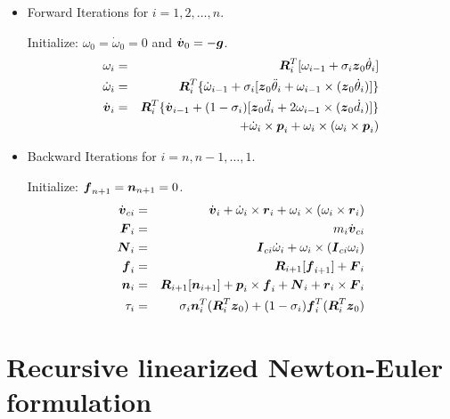 \begin{itemize}
\item Forward Iterations for $i=1, 2, \ldots, n$. 

Initialize: $\omega_0 = \dot{\omega}_0 = 0$ and $\dot{\mbox{\boldmath $ v $}}_0 = - \mbox{\boldmath $ g $}$.
\begin{eqnarray}
\omega_i & = & \mbox{\boldmath $ R $}_i^T [\omega_{i-1} + \sigma_i \mbox{\boldmath $ z $}_0 \dot{\theta}_i ] \\
\dot{\omega}_i & = & \mbox{\boldmath $ R $}_i^T  \{ \dot{\omega}_{i-1} + 
\sigma_i [\mbox{\boldmath $ z $}_0 \ddot{\theta}_i + \omega_{i-1} \times (\mbox{\boldmath $ z $}_0 \dot{\theta}_i )] \} \\
\dot{\mbox{\boldmath $ v $}}_i & = & \mbox{\boldmath $ R $}_i^T  \{ \dot{\mbox{\boldmath $ v $}}_{i-1} + 
(1 -\sigma_i) [\mbox{\boldmath $ z $}_0 \ddot{d}_i + 2 \omega_{i-1} \times (\mbox{\boldmath $ z $}_0 \dot{d}_i )] \} 
\nonumber \\ 
& & + \dot{\omega}_i \times \mbox{\boldmath $ p $}_i + \omega_i \times ( \omega_i \times \mbox{\boldmath $ p $}_i)
\end{eqnarray}

\item Backward Iterations for $i=n, n-1, \ldots, 1$. 

Initialize: $\mbox{\boldmath $ f $}_{n+1} = \mbox{\boldmath $ n $}_{n+1} = 0$.
\begin{eqnarray}
\dot{\mbox{\boldmath $ v $}}_{ci} & = & \dot{\mbox{\boldmath $ v $}}_i + \dot{\omega}_i \times \mbox{\boldmath $ r $}_i 
+ \omega_i \times (\omega_i \times \mbox{\boldmath $ r $}_i) \\
\mbox{\boldmath $ F $}_i & = & m_i \dot{\mbox{\boldmath $ v $}}_{ci} \\
\mbox{\boldmath $ N $}_i & = & \mbox{\boldmath $ I $}_{ci} \dot{\omega}_i + \omega_i \times (\mbox{\boldmath $ I $}_{ci} \omega_i) \\
\mbox{\boldmath $ f $}_i & = & \mbox{\boldmath $ R $}_{i+1} [ \mbox{\boldmath $ f $}_{i+1} ]  + \mbox{\boldmath $ F $}_{i}  \\
\mbox{\boldmath $ n $}_i & = & \mbox{\boldmath $ R $}_{i+1} [ \mbox{\boldmath $ n $}_{i+1} ]  + \mbox{\boldmath $ p $}_{i} \times \mbox{\boldmath $ f $}_{i} 
+ \mbox{\boldmath $ N $}_{i} + \mbox{\boldmath $ r $}_{i} \times \mbox{\boldmath $ F $}_{i} \\
\tau_i & = & \sigma_i \mbox{\boldmath $ n $}_i^T (\mbox{\boldmath $ R $}_i^T \mbox{\boldmath $ z $}_0) 
+ (1 -\sigma_i) \mbox{\boldmath $ f $}_i^T (\mbox{\boldmath $ R $}_i^T \mbox{\boldmath $ z $}_0)
\end{eqnarray}
\end{itemize}


\section{Recursive linearized Newton-Euler formulation}
\label{sec:rlne}


